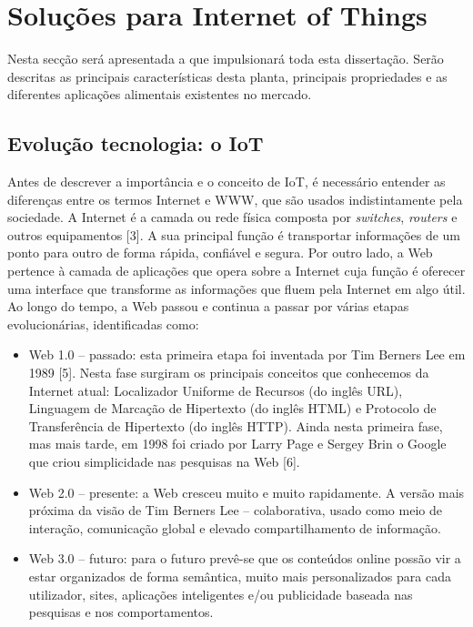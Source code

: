 
\chapter{Soluções para Internet of Things}

Nesta secção será apresentada a \sr que impulsionará toda esta dissertação. Serão descritas as principais características desta planta, principais propriedades e as diferentes aplicações alimentais existentes no mercado. 

	\cite{Our2013}

\section{Evolução tecnologia: o IoT}


Antes de descrever a importância e o conceito de \ac{IoT}, é necessário entender as diferenças entre os termos Internet e \ac{WWW}, que são usados indistintamente pela sociedade. A Internet é a camada ou rede física composta por \textit{switches}, \textit{routers} e outros equipamentos [3]. A sua principal função é transportar informações de um ponto para outro de forma rápida, confiável e segura. Por outro lado, a Web pertence à camada de aplicações que opera sobre a Internet cuja função é oferecer uma interface que transforme as informações que fluem pela Internet em algo útil. Ao longo do tempo, a Web passou e continua a passar por várias etapas evolucionárias, identificadas como:

\begin{itemize}
	\item Web 1.0 – passado: esta primeira etapa foi inventada por Tim Berners Lee em 1989 [5]. Nesta fase surgiram os principais conceitos que conhecemos da Internet atual: Localizador Uniforme de Recursos (do inglês \ac{URL}), Linguagem de Marcação de Hipertexto (do inglês \ac{HTML}) e Protocolo de Transferência de Hipertexto (do inglês \ac{HTTP}). Ainda nesta primeira fase, mas mais tarde, em 1998 foi criado por Larry Page e Sergey Brin o Google que criou simplicidade nas pesquisas na Web [6]. 
	
	\item Web 2.0 – presente: a Web cresceu muito e muito rapidamente. A versão mais próxima da visão de Tim Berners Lee – colaborativa, usado como meio de interação, comunicação global e elevado compartilhamento de informação. 
	
	\item Web 3.0 – futuro: para o futuro prevê-se que os conteúdos online possão vir a estar organizados de forma semântica, muito mais personalizados para cada utilizador, sites, aplicações inteligentes e/ou publicidade baseada nas pesquisas e nos comportamentos.
\end{itemize}

